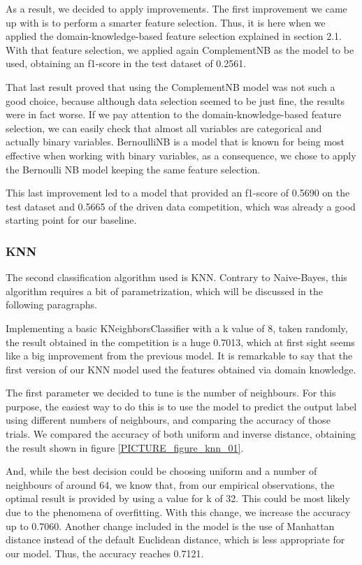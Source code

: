 As a result, we decided to apply improvements. The first improvement we came up with is to perform a smarter feature selection. Thus, it is here when we applied the domain-knowledge-based feature selection explained in section 2.1. With that feature selection, we applied again ComplementNB as the model to be used, obtaining an f1-score in the test dataset of 0.2561. 

That last result proved that using the ComplementNB model was not such a good choice, because although data selection seemed to be just fine, the results were in fact worse. If we pay attention to the domain-knowledge-based feature selection, we can easily check that almost all variables are categorical and actually binary variables. BernoulliNB is a model that is known for being most effective when working with binary variables, as a consequence, we chose to apply the Bernoulli NB model keeping the same feature selection.

This last improvement led to a model that provided an f1-score of 0.5690 on the test dataset and 0.5665 of the driven data competition, which was already a good starting point for our baseline.

\subsubsection{KNN}
The second classification algorithm used is KNN. Contrary to Naive-Bayes, this algorithm requires a bit of parametrization, which will be discussed in the following paragraphs.

Implementing a basic KNeighborsClassifier with a k value of 8, taken randomly, the result obtained in the competition is a huge 0.7013, which at first sight seems like a big improvement from the previous model. It is remarkable to say that the first version of our KNN model used the features obtained via domain knowledge.

The first parameter we decided to tune is the number of neighbours. For this purpose, the easiest way to do this is to use the model to predict the output label using different numbers of neighbours, and comparing the accuracy of those trials. We compared the accuracy of both uniform and inverse distance, obtaining the result shown in figure \ref{PICTURE_figure_knn_01}.

And, while the best decision could be choosing uniform and a number of neighbours of around 64, we know that, from our empirical observations, the optimal result is provided by using a value for k of 32. This could be most likely due to the phenomena of overfitting. With this change, we increase the accuracy up to 0.7060. Another change included in the model is the use of Manhattan distance instead of the default Euclidean distance, which is less appropriate for our model. Thus, the accuracy reaches 0.7121.

